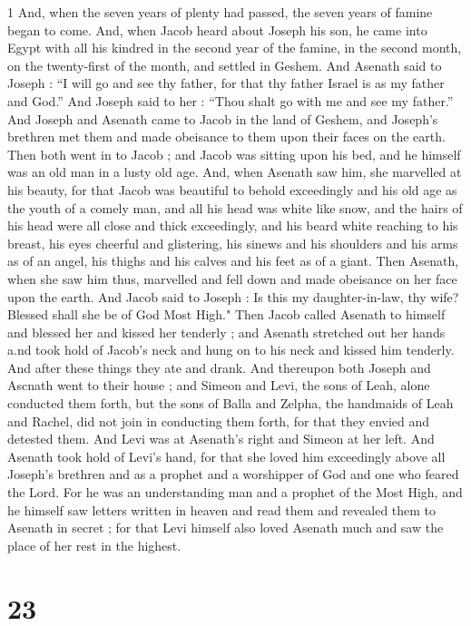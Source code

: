 1 And, when the seven years of plenty had passed, the seven years of famine began to come. And, when Jacob heard about Joseph his son, he came into Egypt with all his kindred in the second year of the famine, in the second month, on the twenty-first of the month, and settled in Geshem. And Asenath said to Joseph : “I will go and see thy father, for that thy father Israel is as my father and God.” And Joseph said to her : “Thou shalt go with me and see my father.” And Joseph and Asenath came to Jacob in the land of Geshem, and Joseph's brethren met them and made obeisance to them upon their faces on the earth. Then both went in to Jacob ; and Jacob was sitting upon his bed, and he himself was an old man in a lusty old age. And, when Asenath saw him, she marvelled at his beauty, for that Jacob was beautiful to behold exceedingly and his old age as the youth of a comely man, and all his head was white like snow, and the hairs of his head were all close and thick exceedingly, and his beard white reaching to his breast, his eyes cheerful and glistering, his sinews and his shoulders and his arms as of an angel, his thighs and his calves and his feet as of a giant. Then Asenath, when she saw him thus, marvelled and fell down and made obeisance on her face upon the earth. And Jacob said to Joseph : Is this my daughter-in-law, thy wife? Blessed shall she be of God Most High." Then Jacob called Asenath to himself and blessed her and kissed her tenderly ; and Asenath stretched out her hands a.nd took hold of Jacob's neck and hung on to his neck and kissed him tenderly. And after these things they ate and drank. And thereupon both Joseph and Ascnath went to their house ; and Simeon and Levi, the sons of Leah, alone conducted them forth, but the sons of Balla and Zelpha, the handmaids of Leah and Rachel, did not join in conducting them forth, for that they envied and detested them. And Levi was at Asenath's right and Simeon at her left. And Asenath took hold of Levi's hand, for that she loved him exceedingly above all Joseph's brethren and as a prophet and a worshipper of God and one who feared the Lord. For he was an understanding man and a prophet of the Most High, and he himself saw letters written in heaven and read them and revealed them to Asenath in secret ; for that Levi himself also loved Asenath much and saw the place of her rest in the highest. 

\chapter{23}

